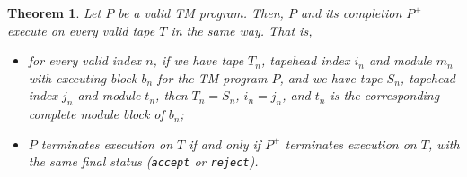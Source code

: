 \documentclass{article}
\theoremstyle{definition}
\theoremstyle{plain}
\newtheorem{theorem}[rules]{Theorem}
\begin{document}
\begin{theorem}
    Let $P$ be a valid TM program. Then, $P$ and its completion $P^+$ execute on every valid tape $T$ in the same way. That is,
    \begin{itemize}
        \item for every valid index $n$, if we have tape $T_n$, tapehead index $i_n$ and module $m_n$ with executing block $b_n$ for the TM program $P$, and we have tape $S_n$, tapehead index $j_n$ and module $t_n$, then $T_n = S_n$, $i_n = j_n$, and $t_n$ is the corresponding complete module block of $b_n$;
        \item $P$ terminates execution on $T$ if and only if $P^+$ terminates execution on $T$, with the same final status (\texttt{accept} or \texttt{reject}).
    \end{itemize}
\end{theorem}
\end{document}
